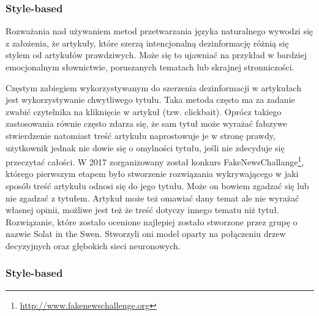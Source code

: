 \subsubsection{Style-based}
Rozważania nad używaniem metod przetwarzania języka naturalnego wywodzi się z założenia, że artykuły, które szerzą intencjonalną dezinformację różnią się stylem od artykułów prawdziwych. Może się to ujawniać na przykład w bardziej emocjonalnym słownictwie, poruszanych tematach lub skrajnej stronniczości.
\par Częstym zabiegiem wykorzystywanym do szerzenia dezinformacji w artykułach jest wykorzystywanie chwytliwego tytułu. Taka metoda często ma za zadanie zwabić czytelnika na kliknięcie w artykuł (tzw. clickbait). Oprócz takiego zastosowania równie często zdarza się, że sam tytuł może wyrażać fałszywe stwierdzenie natomiast treść artykułu naprostowuje je w stronę prawdy, użytkownik jednak nie dowie się o omylności tytułu, jeśli nie zdecyduje się przeczytać całości.  W 2017 zorganizowany został konkurs FakeNewsChallange\footnote{\url{http://www.fakenewschallenge.org}},  którego pierwszym etapem było stworzenie rozwiązania wykrywającego w jaki sposób treść artykułu odnosi się do jego tytułu. Może on bowiem zgadzać się lub nie zgadzać z tytułem. Artykuł może też omawiać dany temat ale nie wyrażać własnej opinii, możliwe jest też że treść dotyczy innego tematu niż tytuł. Rozwiązanie, które zostało ocenione najlepiej zostało stworzone przez grupę o nazwie Solat in the Swen. Stworzyli oni model oparty na połączeniu drzew decyzyjnych oraz głębokich sieci neuronowych.  

\subsubsection{Style-based}
